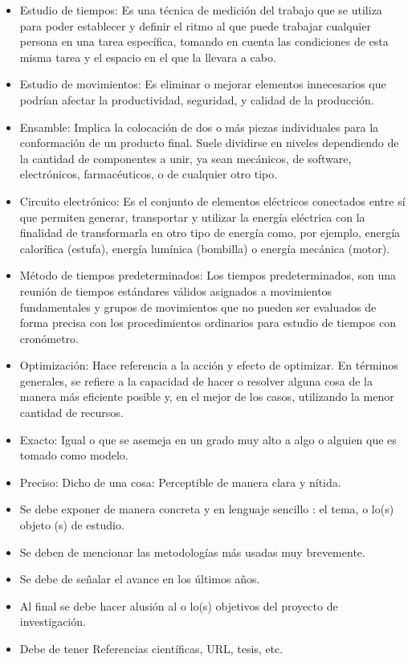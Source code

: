     \begin{itemize}
        \item Estudio de tiempos: Es una técnica de medición del trabajo que se utiliza para poder establecer y definir el ritmo al que puede trabajar cualquier persona en una tarea específica, tomando en cuenta las condiciones de esta misma tarea y el espacio en el que la llevara a cabo.
        \item Estudio de movimientos: Es eliminar o mejorar elementos innecesarios que podrían afectar la productividad, seguridad, y calidad de la producción. 
        \item Ensamble: Implica la colocación de dos o más piezas individuales para la conformación de un producto final. Suele dividirse en niveles dependiendo de la cantidad de componentes a unir, ya sean mecánicos, de software, electrónicos, farmacéuticos, o de cualquier otro tipo.
        \item Circuito electrónico: Es el conjunto de elementos eléctricos conectados entre sí que permiten generar, transportar y utilizar la energía eléctrica con la finalidad de transformarla en otro tipo de energía como, por ejemplo, energía calorífica (estufa), energía lumínica (bombilla) o energía mecánica (motor).
        \item Método de tiempos predeterminados: Los tiempos predeterminados, son una reunión de tiempos estándares válidos asignados a movimientos fundamentales y grupos de movimientos que no pueden ser evaluados de forma precisa con los procedimientos ordinarios para estudio de tiempos con cronómetro.
        \item Optimización: Hace referencia a la acción y efecto de optimizar. En términos generales, se refiere a la capacidad de hacer o resolver alguna cosa de la manera más eficiente posible y, en el mejor de los casos, utilizando la menor cantidad de recursos. 
         \item Exacto: Igual o que se asemeja en un grado muy alto a algo o alguien que es tomado como modelo. 
        \item Preciso: Dicho de una cosa: Perceptible de manera clara y nítida.
    \end{itemize}
    \begin{itemize}
        \item Se debe exponer de manera concreta y en lenguaje sencillo : el tema, o lo(s) objeto (s) de estudio. 
        \item Se deben de mencionar las metodologías más usadas muy brevemente. 
        \item Se debe de señalar el avance en los últimos años.
        \item Al final se debe hacer alusión al o lo(s) objetivos del proyecto de investigación.
        \item Debe de tener Referencias científicas, URL, tesis, etc.
    \end{itemize}
